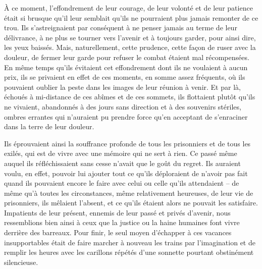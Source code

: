 \documentclass[french,twoside]{book} %
\begin{document}
À ce moment, l’effondrement de leur courage, de leur volonté et de leur patience était si brusque qu’il leur semblait qu’ils ne pourraient plus jamais remonter de ce trou. Ils s’astreignaient par conséquent à ne penser jamais au terme de leur délivrance, à ne plus se tourner vers l’avenir et à toujours garder, pour ainsi dire, les yeux baissés. Mais, naturellement, cette prudence, cette façon de ruser avec la douleur, de fermer leur garde pour refuser le combat étaient mal récompensées. En même temps qu’ils évitaient cet effondrement dont ils ne voulaient à aucun prix, ils se privaient en effet de ces moments, en somme assez fréquents, où ils pouvaient oublier la peste dans les images de leur réunion à venir. Et par là, échoués à mi-distance de ces abîmes et de ces sommets, ils flottaient plutôt qu’ils ne vivaient, abandonnés à des jours sans direction et à des souvenirs stériles, ombres errantes qui n’auraient pu prendre force qu’en acceptant de s’enraciner dans la terre de leur douleur.\par
Ils éprouvaient ainsi la souffrance profonde de tous les prisonniers et de tous les exilés, qui est de vivre avec une mémoire qui ne sert à rien. Ce passé même auquel ils réfléchissaient sans cesse n’avait que le goût du regret. Ils auraient voulu, en effet, pouvoir lui ajouter tout ce qu’ils déploraient de n’avoir pas fait quand ils pouvaient encore le faire avec celui ou celle qu’ils attendaient – de même qu’à toutes les circonstances, même relativement heureuses, de leur vie de prisonniers, ils mêlaient l’absent, et ce qu’ils étaient alors ne pouvait les satisfaire. Impatients de leur présent, ennemis de leur passé et privés d’avenir, nous ressemblions bien ainsi à ceux que la justice ou la haine humaines font vivre derrière des barreaux. Pour finir, le seul moyen d’échapper à ces vacances insupportables était de faire marcher à nouveau les trains par l’imagination et de remplir les heures avec les carillons répétés d’une sonnette pourtant obstinément silencieuse.\par
\end{document}

